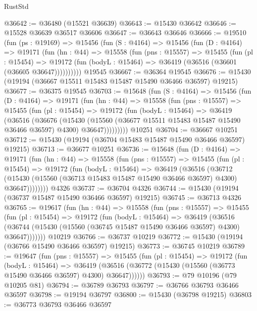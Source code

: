 \begin{lexlean}{RustStd}
\begin{coremodule}
{\begin{coremodule}
{{{{{{{{{{{{{{{{{{{{{{{{{{{{{{{{{{{{{{{{{{{{{{{{{{{{{{{{{{{{@36642 := @36480 (@15521 @36639)
@36643 := @15430 @36642
@36646 := @15528 @36639 @36517 @36606
@36647 := @36643 @36646
@36666 := @19510
    (fun (ps : @19169) =>
    @15456
      (fun (S : @4164) =>
      @15456
        (fun (D : @4164) =>
        @19171
          (fun (hn : @44) =>
          @15558
            (fun (pns : @15557) =>
            @15455
              (fun (pl : @15454) =>
              @19172 (fun (bodyL : @15464) => @36419 (@36516 (@36601 (@36605 @36647))))))))))
    @19545
@36667 := @36364 @19545
@36676 := @15430 (@19194 (@36667 @15511 @15483 @15487 @15490 @36466 @36597) @19215)
@36677 := @36375 @19545
@36703 := @15648
    (fun (S : @4164) =>
    @15456
      (fun (D : @4164) =>
      @19171
        (fun (hn : @44) =>
        @15558
          (fun (pns : @15557) =>
          @15455
            (fun (pl : @15454) =>
            @19172
              (fun (bodyL : @15464) =>
              @36419
                (@36516
                  (@36676
                    (@15430
                      (@15560 (@36677 @15511 @15483 @15487 @15490 @36466 @36597) @4300)
                      @36647)))))))))
    @10251
@36704 := @36667 @10251
@36712 := @15430 (@19194 (@36704 @15483 @15487 @15490 @36466 @36597) @19215)
@36713 := @36677 @10251
@36736 := @15648
    (fun (D : @4164) =>
    @19171
      (fun (hn : @44) =>
      @15558
        (fun (pns : @15557) =>
        @15455
          (fun (pl : @15454) =>
          @19172
            (fun (bodyL : @15464) =>
            @36419
              (@36516
                (@36712
                  (@15430 (@15560 (@36713 @15483 @15487 @15490 @36466 @36597) @4300) @36647))))))))
    @4326
@36737 := @36704 @4326
@36744 := @15430 (@19194 (@36737 @15487 @15490 @36466 @36597) @19215)
@36745 := @36713 @4326
@36765 := @19617
    (fun (hn : @44) =>
    @15558
      (fun (pns : @15557) =>
      @15455
        (fun (pl : @15454) =>
        @19172
          (fun (bodyL : @15464) =>
          @36419
            (@36516
              (@36744 (@15430 (@15560 (@36745 @15487 @15490 @36466 @36597) @4300) @36647)))))))
    @10219
@36766 := @36737 @10219
@36772 := @15430 (@19194 (@36766 @15490 @36466 @36597) @19215)
@36773 := @36745 @10219
@36789 := @19647
    (fun (pns : @15557) =>
    @15455
      (fun (pl : @15454) =>
      @19172
        (fun (bodyL : @15464) =>
        @36419 (@36516 (@36772 (@15430 (@15560 (@36773 @15490 @36466 @36597) @4300) @36647))))))
@36793 := @79 @10196 (@79 @10205 @81)
@36794 := @36789 @36793
@36797 := @36766 @36793 @36466 @36597
@36798 := @19194 @36797
@36800 := @15430 (@36798 @19215)
@36803 := @36773 @36793 @36466 @36597
}}}}}}}}}}}}}}}}}}}}}}}}}}}}}}}}}}}}}}}}}}}}}}}}}}}}}}}}}}}}
\end{coremodule}}
\end{coremodule}
\end{lexlean}
